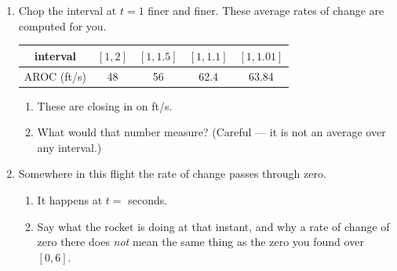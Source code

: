 \documentclass[10pt]{article}
\begin{document}
\boxguard[26]
\begin{tcolorbox}[colback=white, colframe=black!40,
    title=\textbf{Tier E --- Extension},
    fonttitle=\bfseries, arc=2mm, left=3mm, right=3mm, top=2mm, bottom=2mm]

\begin{enumerate}[itemsep=8pt]
  \item Chop the interval at $t = 1$ finer and finer. These average rates of
        change are computed for you.

        \smallskip
        \renewcommand{\arraystretch}{1.4}
        \begin{center}
        \begin{tabular}{|c|c|c|c|c|}
        \hline
        interval & $[1,2]$ & $[1,1.5]$ & $[1,1.1]$ & $[1,1.01]$ \\
        \hline
        AROC (ft/s) & 48 & 56 & 62.4 & 63.84 \\
        \hline
        \end{tabular}
        \end{center}
        \smallskip

        \begin{enumerate}[label=(\alph*), itemsep=4pt]
          \item These are closing in on  ft/s.
          \item What would that number measure? (Careful --- it is not an
                average over any interval.)

                \vspace{0.05in}
        \end{enumerate}

  \item Somewhere in this flight the rate of change passes through zero.

        \begin{enumerate}[label=(\alph*), itemsep=4pt]
          \item It happens at $t = $  seconds.
          \item Say what the rocket is doing at that instant, and why a rate
                of change of zero there does \textit{not} mean the same thing
                as the zero you found over $[0,6]$.

                \vspace{0.05in}
        \end{enumerate}


\end{enumerate}
\end{tcolorbox}
\end{document}
